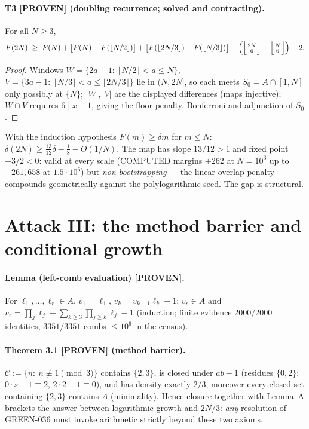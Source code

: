 \documentclass[11pt]{article}
\theoremstyle{definition}
\newcommand{\A}{A}
\newcommand{\F}{F}
\begin{document}
\paragraph{T3 [PROVEN] (doubling recurrence; solved and contracting).}
For all $N\ge3$,
\[
\F(2N)\;\ge\;\F(N)+\bigl[\F(N)-\F(\lfloor N/2\rfloor)\bigr]
+\bigl[\F(\lfloor 2N/3\rfloor)-\F(\lfloor N/3\rfloor)\bigr]
-\Bigl(\Bigl\lfloor\tfrac{2N}{6}\Bigr\rfloor-\Bigl\lfloor\tfrac N6\Bigr\rfloor\Bigr)-2 .
\]
\begin{proof}
Windows $W=\{2a-1:\ \lfloor N/2\rfloor<a\le N\}$,
$V=\{3a-1:\ \lfloor N/3\rfloor<a\le\lfloor2N/3\rfloor\}$ lie in $(N,2N]$,
so each meets $S_0=\A\cap[1,N]$ only possibly at $\{N\}$;
$|W|,|V|$ are the displayed differences (maps injective);
$W\cap V$ requires $6\mid x+1$, giving the floor penalty. Bonferroni and
adjunction of $S_0$. \end{proof}
With the induction hypothesis $\F(m)\ge\delta m$ for $m\le N$:
$\delta(2N)\ge\frac{13}{12}\delta-\frac18-O(1/N)$.
The map has slope $13/12>1$ and fixed point $-3/2<0$: valid at every scale
(COMPUTED margins $+262$ at $N=10^3$ up to $+261{,}658$ at $1.5\cdot10^6$)
but \emph{non-bootstrapping} --- the linear overlap penalty compounds
geometrically against the polylogarithmic seed. The gap is structural.

\section{Attack III: the method barrier and conditional growth}\label{sec:attack3}

\paragraph{Lemma (left-comb evaluation) [PROVEN].}
For $\ell_1,\dots,\ell_r\in\A$, $v_1=\ell_1$, $v_k=v_{k-1}\ell_k-1$:
$v_r\in\A$ and $v_r=\prod_j\ell_j-\sum_{k\ge3}\prod_{j\ge k}\ell_j-1$
(induction; finite evidence $2000/2000$ identities, $3351/3351$ combs
$\le10^6$ in the census).

\paragraph{Theorem 3.1 [PROVEN] (method barrier).}
$\mathcal{C}:=\{n:\ n\not\equiv1\pmod3\}$ contains $\{2,3\}$, is closed
under $ab-1$ (residues $\{0,2\}$: $0\cdot s-1\equiv2$, $2\cdot2-1\equiv0$),
and has density exactly $2/3$; moreover every closed set containing
$\{2,3\}$ contains $\A$ (minimality). Hence closure together with Lemma~A
brackets the answer between logarithmic growth and $2N/3$: \emph{any}
resolution of GREEN-036 must invoke arithmetic strictly beyond these two
axioms.
\end{document}
